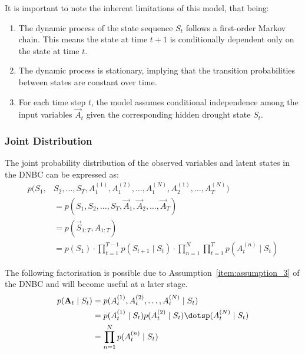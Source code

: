 It is important to note the inherent limitations of this model, that being:
\begin{enumerate}[label=(\roman*)]
    \item The dynamic process of the state sequence $S_t$ follows a first-order Markov chain. This means the state at time $t+1$ is conditionally dependent only on the state at time $t$. \label{item:assumption_1}
    \item The dynamic process is stationary, implying that the transition probabilities between states are constant over time. \label{item:assumption_2}
    \item For each time step $t$, the model assumes conditional independence among the input variables $\vec{A}_t$ given the corresponding hidden drought state $S_t$. \label{item:assumption_3}
\end{enumerate}

\subsubsection{Joint Distribution}

The joint probability distribution of the observed variables and latent states in the DNBC can be expressed as:
\begin{equation}
    \begin{align}
        p(S_1, &S_2, \dots, S_T, A^{(1)}_1, A^{(2)}_1, \dots, A^{(N)}_1, A^{(1)}_2, \dots, A^{(N)}_T) \\ 
        &= p(S_1, S_2, \dots, S_T, \vec{A}_1, \vec{A}_2, \dots, \vec{A}_T) \\
        &= p(\vec{S}_{1:T}, A_{1:T}) \\
        &= p(S_1) \cdot \prod\limits_{t=1}^{T-1} p(S_{t+1} \mid S_t) \cdot \prod\limits_{n=1}^{N} \prod\limits_{t=1}^T p(A^{(n)}_t \mid S_t)
    \end{align}
    \label{eqn:joint_distr}
\end{equation}

The following factorisation is possible due to Assumption~\ref{item:assumption_3} of the DNBC and will become useful at a later stage.
\begin{equation} 
    \begin{align} 
        p(\vec{A}_{t} \mid S_t) &= p(A_t^{(1)}, A_t^{(2)}, \dots, A_t^{(N)} \mid S_t) \\ 
        &= p(A_t^{(1)} \mid S_t)p(A_t^{(2)} \mid S_t)\dotsp(A_t^{(N)} \mid S_t) \\ 
        &= \prod\limits_{n=1}^N p(A_t^{(n)} \mid S_t) 
    \end{align} 
    \label{eqn:attribute_rv_factorisation} 
\end{equation}

